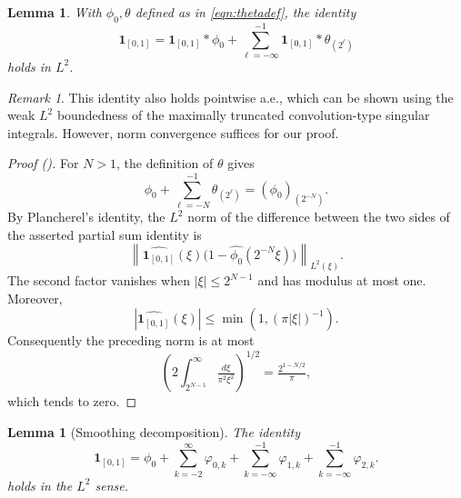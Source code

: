 \documentclass[12pt,reqno]{amsart}
\newcommand{\auto}{{({\tiny\faCar})}}
\theoremstyle{plain}
\newtheorem{lemma}[theorem]{Lemma}
\numberwithin{equation}{section}
\theoremstyle{remark}
\newtheorem{rem}{Remark}[section]
\newcommand{\using}[1]{}
\begin{document}
\begin{lemma}\label{lem:chardecomp}
With $\phi_0,\theta$ defined as in \eqref{eqn:thetadef}, the identity
 \begin{equation}\label{auto:indicator-smoothing-decomposition} \mathbf{1}_{[0,1]} = \mathbf{1}_{[0,1]}* \phi_0 +  \sum_{\ell=-\infty}^{-1} \mathbf{1}_{[0,1]} * \theta_{(2^\ell)}  \end{equation}
holds in $L^2$.
\end{lemma}

\begin{rem}
    This identity also holds pointwise a.e., which can be shown using the weak $L^2$ boundedness of the maximally truncated convolution-type singular integrals. However, norm  convergence   suffices for our proof.
\end{rem}


\begin{proof}[Proof \auto]
For $N>1$, the definition of $\theta$ gives
\[
\phi_0+\sum_{\ell=-N}^{-1}\theta_{(2^\ell)}
=(\phi_0)_{(2^{-N})}.
\]
By Plancherel's identity, the $L^2$ norm of the difference between the two sides of the asserted partial sum identity is
\[
\left\|\widehat{\mathbf1_{[0,1]}}(\xi)
\bigl(1-\widehat{\phi_0}(2^{-N}\xi)\bigr)\right\|_{L^2(\xi)}.
\]
The second factor vanishes when $|\xi|\le2^{N-1}$ and has modulus at most one. Moreover,
\[
|\widehat{\mathbf1_{[0,1]}}(\xi)|
\le\min(1,(\pi|\xi|)^{-1}).
\]
Consequently the preceding norm is at most
\[
\left(2\int_{2^{N-1}}^\infty\tfrac{d\xi}{\pi^2\xi^2}\right)^{1/2}
=\tfrac{2^{1-N/2}}{\pi},
\]
which tends to zero.
\end{proof}


\begin{lemma}[Smoothing decomposition]\label{lem:smoothingdecomp}\using{lem:chardecomp}\using{lem:bumpbasic}
The identity
\begin{equation}\label{eq:seriesexpansion}
\mathbf{1}_{[0,1]} = \phi_0 + \sum_{k=-2}^\infty \varphi_{0,k}  + \sum_{k=-\infty}^{-1} \varphi_{1,k}+ \sum_{k=-\infty}^{-1}\varphi_{2,k}.
\end{equation}
holds in the $L^2$ sense.
\end{lemma}
\end{document}
